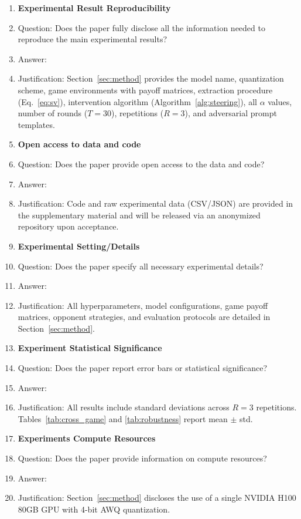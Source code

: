 \documentclass{article}
\begin{document}
\begin{enumerate}
\item {\bf Experimental Result Reproducibility}
    \item[] Question: Does the paper fully disclose all the information needed to reproduce the main experimental results?
    \item[] Answer: \answerYes{}
    \item[] Justification: Section~\ref{sec:method} provides the model name, quantization scheme, game environments with payoff matrices, extraction procedure (Eq.~\ref{eq:sv}), intervention algorithm (Algorithm~\ref{alg:steering}), all $\alpha$ values, number of rounds ($T=30$), repetitions ($R=3$), and adversarial prompt templates.

\item {\bf Open access to data and code}
    \item[] Question: Does the paper provide open access to the data and code?
    \item[] Answer: \answerYes{}
    \item[] Justification: Code and raw experimental data (CSV/JSON) are provided in the supplementary material and will be released via an anonymized repository upon acceptance.

\item {\bf Experimental Setting/Details}
    \item[] Question: Does the paper specify all necessary experimental details?
    \item[] Answer: \answerYes{}
    \item[] Justification: All hyperparameters, model configurations, game payoff matrices, opponent strategies, and evaluation protocols are detailed in Section~\ref{sec:method}.

\item {\bf Experiment Statistical Significance}
    \item[] Question: Does the paper report error bars or statistical significance?
    \item[] Answer: \answerYes{}
    \item[] Justification: All results include standard deviations across $R=3$ repetitions. Tables~\ref{tab:cross_game} and \ref{tab:robustness} report mean $\pm$ std.

\item {\bf Experiments Compute Resources}
    \item[] Question: Does the paper provide information on compute resources?
    \item[] Answer: \answerYes{}
    \item[] Justification: Section~\ref{sec:method} discloses the use of a single NVIDIA H100 80GB GPU with 4-bit AWQ quantization.


\end{enumerate}
\end{document}
